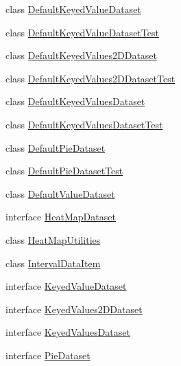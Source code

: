 \begin{DoxyCompactItemize}
\item 
class \mbox{\hyperlink{classorg_1_1jfree_1_1data_1_1general_1_1_default_keyed_value_dataset}{Default\+Keyed\+Value\+Dataset}}
\item 
class \mbox{\hyperlink{classorg_1_1jfree_1_1data_1_1general_1_1_default_keyed_value_dataset_test}{Default\+Keyed\+Value\+Dataset\+Test}}
\item 
class \mbox{\hyperlink{classorg_1_1jfree_1_1data_1_1general_1_1_default_keyed_values2_d_dataset}{Default\+Keyed\+Values2\+D\+Dataset}}
\item 
class \mbox{\hyperlink{classorg_1_1jfree_1_1data_1_1general_1_1_default_keyed_values2_d_dataset_test}{Default\+Keyed\+Values2\+D\+Dataset\+Test}}
\item 
class \mbox{\hyperlink{classorg_1_1jfree_1_1data_1_1general_1_1_default_keyed_values_dataset}{Default\+Keyed\+Values\+Dataset}}
\item 
class \mbox{\hyperlink{classorg_1_1jfree_1_1data_1_1general_1_1_default_keyed_values_dataset_test}{Default\+Keyed\+Values\+Dataset\+Test}}
\item 
class \mbox{\hyperlink{classorg_1_1jfree_1_1data_1_1general_1_1_default_pie_dataset}{Default\+Pie\+Dataset}}
\item 
class \mbox{\hyperlink{classorg_1_1jfree_1_1data_1_1general_1_1_default_pie_dataset_test}{Default\+Pie\+Dataset\+Test}}
\item 
class \mbox{\hyperlink{classorg_1_1jfree_1_1data_1_1general_1_1_default_value_dataset}{Default\+Value\+Dataset}}
\item 
interface \mbox{\hyperlink{interfaceorg_1_1jfree_1_1data_1_1general_1_1_heat_map_dataset}{Heat\+Map\+Dataset}}
\item 
class \mbox{\hyperlink{classorg_1_1jfree_1_1data_1_1general_1_1_heat_map_utilities}{Heat\+Map\+Utilities}}
\item 
class \mbox{\hyperlink{classorg_1_1jfree_1_1data_1_1general_1_1_interval_data_item}{Interval\+Data\+Item}}
\item 
interface \mbox{\hyperlink{interfaceorg_1_1jfree_1_1data_1_1general_1_1_keyed_value_dataset}{Keyed\+Value\+Dataset}}
\item 
interface \mbox{\hyperlink{interfaceorg_1_1jfree_1_1data_1_1general_1_1_keyed_values2_d_dataset}{Keyed\+Values2\+D\+Dataset}}
\item 
interface \mbox{\hyperlink{interfaceorg_1_1jfree_1_1data_1_1general_1_1_keyed_values_dataset}{Keyed\+Values\+Dataset}}
\item 
interface \mbox{\hyperlink{interfaceorg_1_1jfree_1_1data_1_1general_1_1_pie_dataset}{Pie\+Dataset}}

\end{DoxyCompactItemize}
